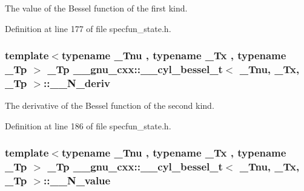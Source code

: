The value of the Bessel function of the first kind. 



Definition at line 177 of file specfun\+\_\+state.\+h.

\subsubsection[{\texorpdfstring{\+\_\+\+\_\+\+N\+\_\+deriv}{__N_deriv}}]{\setlength{\rightskip}{0pt plus 5cm}template$<$typename \+\_\+\+Tnu , typename \+\_\+\+Tx , typename \+\_\+\+Tp $>$ \+\_\+\+Tp {\bf \+\_\+\+\_\+gnu\+\_\+cxx\+::\+\_\+\+\_\+cyl\+\_\+bessel\+\_\+t}$<$ \+\_\+\+Tnu, \+\_\+\+Tx, \+\_\+\+Tp $>$\+::\+\_\+\+\_\+\+N\+\_\+deriv}\hypertarget{struct____gnu__cxx_1_1____cyl__bessel__t_a4bed189cfce4ef5f47cae245a7278f83}{}\label{struct____gnu__cxx_1_1____cyl__bessel__t_a4bed189cfce4ef5f47cae245a7278f83}


The derivative of the Bessel function of the second kind. 



Definition at line 186 of file specfun\+\_\+state.\+h.

\subsubsection[{\texorpdfstring{\+\_\+\+\_\+\+N\+\_\+value}{__N_value}}]{\setlength{\rightskip}{0pt plus 5cm}template$<$typename \+\_\+\+Tnu , typename \+\_\+\+Tx , typename \+\_\+\+Tp $>$ \+\_\+\+Tp {\bf \+\_\+\+\_\+gnu\+\_\+cxx\+::\+\_\+\+\_\+cyl\+\_\+bessel\+\_\+t}$<$ \+\_\+\+Tnu, \+\_\+\+Tx, \+\_\+\+Tp $>$\+::\+\_\+\+\_\+\+N\+\_\+value}\hypertarget{struct____gnu__cxx_1_1____cyl__bessel__t_ac85df4718f58f14fd64631bbd41e8817}{}\label{struct____gnu__cxx_1_1____cyl__bessel__t_ac85df4718f58f14fd64631bbd41e8817}


